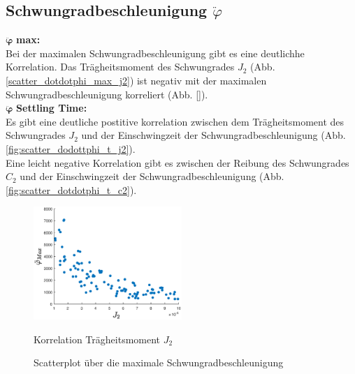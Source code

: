 \subsection*{Schwungradbeschleunigung $\ddot\varphi$}
$\bm{\ddot\varphi}$ \textbf{max: }\\
Bei der maximalen Schwungradbeschleunigung gibt es eine deutlichhe Korrelation.
Das Trägheitsmoment des Schwungrades $J_2$ (Abb.\ref{scatter_dotdotphi_max_j2}) ist negativ mit der maximalen Schwungradbeschleunigung korreliert (Abb. \ref{}).\\

$\bm{\ddot\varphi}$ \textbf{Settling Time: }\\
Es gibt eine deutliche postitive korrelation zwischen dem Trägheitsmoment des Schwungrades $J_2$ und der Einschwingzeit der Schwungradbeschleunigung (Abb. \ref{fig:scatter_dodottphi_t_j2}).\\
Eine leicht negative Korrelation gibt es zwischen der Reibung des Schwungrades $C_2$ und der Einschwingzeit der Schwungradbeschleunigung (Abb. \ref{fig:scatter_dotdotphi_t_c2}).\\
\begin{figure}
    \centering
        \centering
        \includegraphics[width=0.5\textwidth]{Bilder/5_sensi/cm/dotdot_phi_max_J2.eps}
        \caption{Korrelation Trägheitsmoment $J_2$}
        \label{fig:scatter_dotdotphi_max_j2}
    \caption{Scatterplot über die maximale Schwungradbeschleunigung}
\end{figure}

